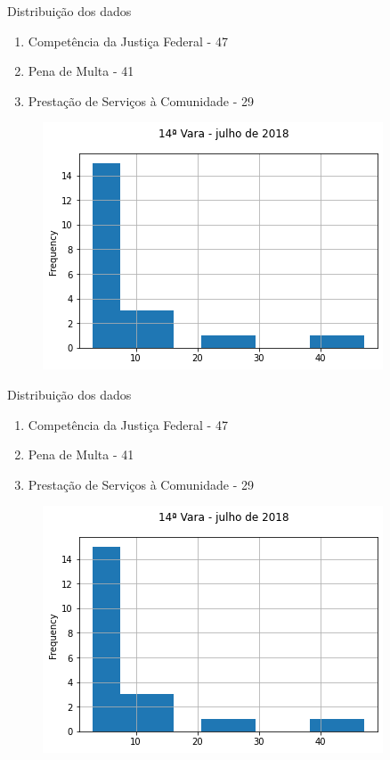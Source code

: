 \documentclass[10pt,t]{beamer}
\begin{document}
\begin{frame}{Distribuição dos dados}
	\begin{enumerate}
		\item Competência da Justiça Federal - 47
		\item Pena de Multa - 41
		\item Prestação de Serviços à Comunidade - 29
	\end{enumerate}
	\begin{figure}
		\centering
		\includegraphics[scale=0.50]{./imagens/Vara_14_julho_2018.png}
	\end{figure}
\end{frame}

\begin{frame}{Distribuição dos dados}
	\begin{enumerate}
		\item Competência da Justiça Federal - 47
		\item Pena de Multa - 41
		\item Prestação de Serviços à Comunidade - 29
	\end{enumerate}
	\begin{figure}
		\centering
		\includegraphics[scale=0.50]{./imagens/Vara_14_julho_2018.png}
	\end{figure}
\end{frame}
\end{document}
